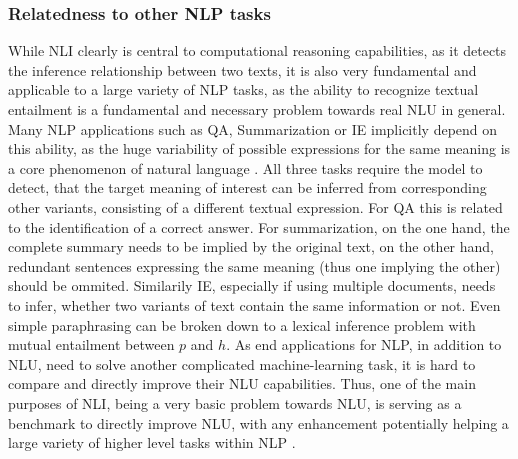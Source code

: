 \subsubsection{Relatedness to other NLP tasks}
While \ac{NLI} clearly is central to computational reasoning capabilities, as it detects the inference relationship between two texts, it is also very fundamental and applicable to a large variety of \ac{NLP} tasks, as the ability to recognize textual entailment is a fundamental and necessary problem towards real \ac{NLU} \citep{maccartney2007natural,bos2005recognising} in general. Many \ac{NLP} applications such as \ac{QA}, Summarization or \ac{IE} implicitly depend on this ability, as the huge variability of possible expressions for the same meaning is a core phenomenon of natural language \citep{dagan2009recognizing}. All three tasks require the model to detect, that the target meaning of interest can be inferred from corresponding other variants, consisting of a different textual expression. For \ac{QA} this is related to the identification of a correct answer. For summarization, on the one hand, the complete summary needs to be implied by the original text, on the other hand, redundant sentences expressing the same meaning (thus one implying the other) should be ommited. Similarily \ac{IE}, especially if using multiple documents, needs to infer, whether two variants of text contain the same information or not. Even simple paraphrasing can be broken down to a lexical inference problem with mutual entailment between $p$ and $h$. As end applications for \ac{NLP}, in addition to \ac{NLU}, need to solve another complicated machine-learning task, it is hard to compare and directly improve their \ac{NLU} capabilities. Thus, one of the main purposes of \ac{NLI}, being a very basic problem towards \ac{NLU}, is serving as a benchmark to directly improve \ac{NLU}, with any enhancement potentially helping a large variety of higher level tasks within \ac{NLP} \citep{williams2017broad,cooper1996using,bos2005recognising,dagan2006pascal}.  

